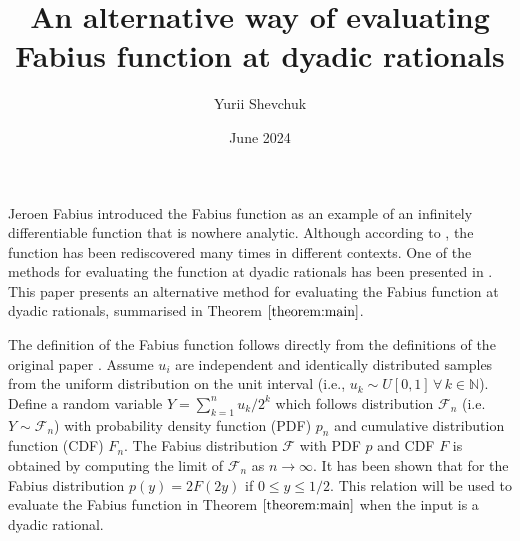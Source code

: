 \documentclass{article}
\title{An alternative way of evaluating Fabius function at dyadic rationals}
\author{Yurii Shevchuk}
\date{June 2024}
\newtheorem{lemma}{Lemma}
\begin{document}
\maketitle

Jeroen Fabius introduced the Fabius function \cite{Fabius1966APE} as an example of an infinitely differentiable function that is nowhere analytic. Although according to \cite{dereyna2017arithmetic}, the function has been rediscovered many times in different contexts. One of the methods for evaluating the function at dyadic rationals has been presented in \cite{haugland2020evaluating}. This paper presents an alternative method for evaluating the Fabius function at dyadic rationals, summarised in Theorem $\ref{theorem:main}$.

The definition of the Fabius function follows directly from the definitions of the original paper \cite{Fabius1966APE}. Assume $u_i$ are independent and identically distributed samples from the uniform distribution on the unit interval (i.e., $u_k \sim U[0, 1] \,\forall\, k \in \mathbb{N}$). Define a random variable $Y = \sum_{k=1}^{n} u_k/2^k$  which follows distribution $\mathcal{F}_n$ (i.e. $Y \sim \mathcal{F}_n$) with probability density function (PDF) $p_n$ and cumulative distribution function (CDF) $F_n$. The Fabius distribution $\mathcal{F}$ with PDF $p$ and CDF $F$ is obtained by computing the limit of $\mathcal{F}_n$ as $n \to \infty$. It has been shown \cite{Fabius1966APE} that for the Fabius distribution $p(y) = 2F(2y)$ if $0 \le y \le 1/2$. This relation will be used to evaluate the Fabius function in Theorem $\ref{theorem:main}$ when the input is a dyadic rational.

\end{document}

